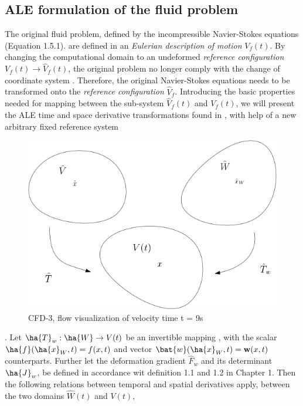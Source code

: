 \subsection{ALE formulation of the fluid problem}
The original fluid problem, defined by the incompressible Navier-Stokes equations (Equation 1.5.1). are defined in an \textit{Eulerian description of motion} $V_f (t)$. By changing the computational domain to an undeformed \textit{reference configuration} $V_f (t) \rightarrow \hat{V}_f (t)$, the original problem no longer comply with the change of coordinate system . Therefore,  the original Navier-Stokes equations needs to be transformed onto the  \textit{reference configuration} $\hat{V}_f $.
Introducing the basic properties needed for mapping between the sub-system $\hat{V}_f (t)$ and $V_f (t)$, we will present the ALE  time and space derivative transformations found in \cite{Richter2016}, with help of a new arbitrary fixed reference system  

\begin{figure}[h!]
  \centering
    \includegraphics[scale=0.5]{./Fig/wdom.png}
      \caption{CFD-3, flow visualization of velocity time t = 9s}
\end{figure}


. Let $\ha{T}_w : \ha{W} \rightarrow V(t)$ be an  invertible mapping , with the scalar $\ha{f}(\ha{x}_W, t) = f(x,t) $ and vector $\bat{w}(\ha{x}_W, t) = \mathbf{w}(x,t) $ counterparts. Further let the deformation gradient $\hat{F}_w$ and its determinant $\ha{J}_w$, be defined in accordance wit definition 1.1 and 1.2 in Chapter 1. Then the following relations between temporal and spatial derivatives apply, between the two domains $\hat{W} (t)$ and $V (t)$,



